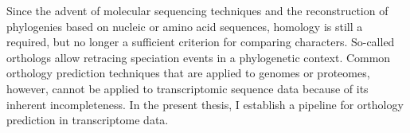 Since the advent of molecular sequencing techniques and the reconstruction of
phylogenies based on nucleic or amino acid sequences, homology is still a required,
but no longer a sufficient criterion for comparing characters. So-called
orthologs allow retracing speciation events in a phylogenetic context. Common
orthology prediction techniques that are applied to genomes or proteomes,
however, cannot be applied to transcriptomic sequence data because of its
inherent incompleteness. In the present thesis, I establish a pipeline for
orthology prediction in transcriptome data.

